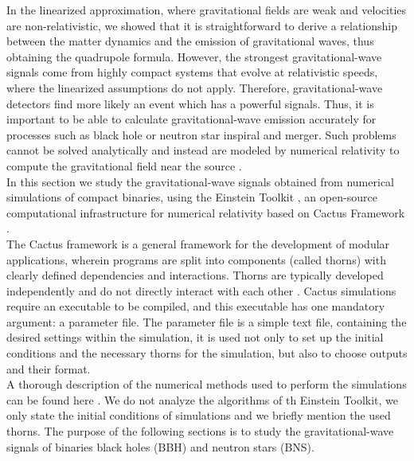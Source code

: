 In the linearized approximation, where gravitational fields are weak and velocities are non-relativistic, we showed that it is straightforward to derive a relationship between the matter dynamics and the emission of gravitational waves, thus obtaining the quadrupole formula.
However, the strongest gravitational-wave signals come from highly compact systems that evolve at relativistic speeds, where the linearized assumptions do not apply. 
Therefore, gravitational-wave detectors find more likely an event which has a powerful signals.
Thus, it is important to be able to calculate gravitational-wave emission accurately for processes such as black hole or neutron star inspiral and merger.
Such problems cannot be solved analytically and instead are modeled by numerical relativity to compute the gravitational field near the source \cite{bishop_extraction_2016}.\\
In this section we study the gravitational-wave signals obtained from numerical simulations of compact binaries, using the Einstein Toolkit \cite{loffler_einstein_2012,EinsteinToolkit:web,EinsteinToolkit:ascl}, an open-source computational infrastructure for numerical relativity based on Cactus Framework \cite{noauthor_cactus_nodate}.\\
The Cactus framework is a general framework for the development of modular applications, wherein programs are split into components (called thorns) with clearly defined dependencies and interactions. 
Thorns are typically developed independently and do not directly interact with each other \cite{zilhaoIntroductionEinsteinToolkit2013}. 
Cactus simulations require an executable to be compiled, and this executable has one mandatory argument: a parameter file.
The parameter file is a simple text file, containing the desired settings within the simulation, it is used not only to set up the initial conditions and the necessary thorns for the simulation, but also to choose outputs and their format.
\\
A thorough description of the numerical methods used to perform the simulations can be found here \cite{loffler_einstein_2012}. 
We do not analyze the algorithms of th Einstein Toolkit, we only state the initial conditions of simulations and we briefly mention the used thorns. 
The purpose of the following sections is to study the gravitational-wave signals of binaries black holes (BBH) and neutron stars (BNS).
\\ 
